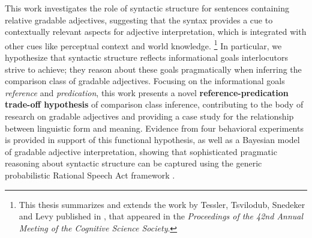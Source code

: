 This work investigates the role of syntactic structure for sentences containing relative gradable adjectives, suggesting that the syntax provides a cue to contextually relevant aspects for adjective interpretation, which is integrated with other cues like perceptual context and world knowledge.  \footnote{This thesis summarizes and extends the work by Tessler, Tsvilodub, Snedeker and Levy published in \textcite{tessler2020}, that appeared in the \textit{Proceedings of the 42nd Annual Meeting of the Cognitive Science Society}.} In particular, we hypothesize that syntactic structure reflects informational goals interlocutors strive to achieve; they reason about these goals pragmatically when inferring the comparison class of gradable adjectives. Focusing on the informational goals \textit{reference} and \textit{predication}, this work presents a novel \textbf{reference-predication trade-off hypothesis} of comparison class inference, contributing to the body of research on gradable adjectives and providing a case study for the relationship between linguistic form and meaning. Evidence from four behavioral experiments is provided in support of this functional hypothesis, as well as a Bayesian model of gradable adjective interpretation, showing that sophisticated pragmatic reasoning about syntactic structure can be captured using the generic probabilistic Rational Speech Act framework \parencite{goodman2016}. 
	
